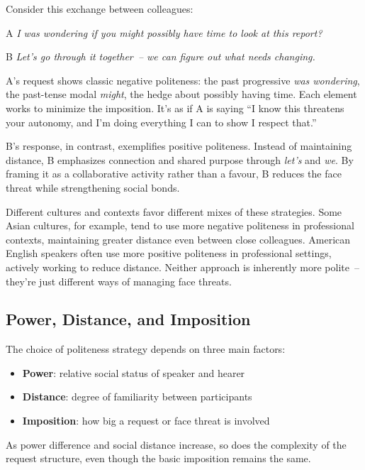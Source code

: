 Consider this exchange between colleagues:

\begin{dialogue}
\item[A] \textit{I was wondering if you might possibly have time to look at this report?}
\item[B] \textit{Let's go through it together~-- we can figure out what needs changing.}
\end{dialogue}

A's request shows classic negative politeness: the past progressive \textit{was wondering}, the past-tense modal \textit{might}, the hedge about possibly having time. Each element works to minimize the imposition. It's as if A is saying ``I know this threatens your autonomy, and I'm doing everything I can to show I respect that.''

B's response, in contrast, exemplifies positive politeness. Instead of maintaining distance, B emphasizes connection and shared purpose through \textit{let's} and \textit{we}. By framing it as a collaborative activity rather than a favour, B reduces the face threat while strengthening social bonds.

Different cultures and contexts favor different mixes of these strategies. Some Asian cultures, for example, tend to use more negative politeness in professional contexts, maintaining greater distance even between close colleagues. American English speakers often use more positive politeness in professional settings, actively working to reduce distance. Neither approach is inherently more polite~-- they're just different ways of managing face threats.

\subsection{Power, Distance, and Imposition}\label{sec:power}

The choice of politeness strategy depends on three main factors:
\begin{itemize}[noitemsep]
    \item \textbf{Power}: relative social status of speaker and hearer
    \item \textbf{Distance}: degree of familiarity between participants
    \item \textbf{Imposition}: how big a request or face threat is involved
\end{itemize}

As power difference and social distance increase, so does the complexity of the request structure, even though the basic imposition remains the same.

